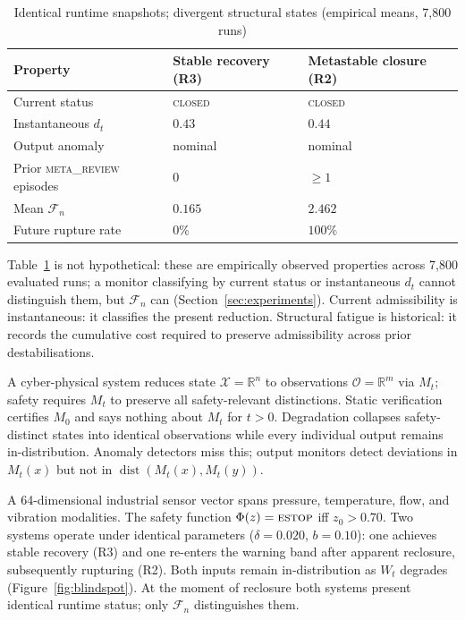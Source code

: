 \documentclass{llncs}
\DeclareMathOperator{\dist}{dist}
\newcommand{\st}[1]{\textup{\textsc{#1}}}
\begin{document}
\begin{table}[H]
\centering
\caption{Identical runtime snapshots; divergent structural states
  (empirical means, 7,800 runs)}
\label{tab:hidden}
\small
\begin{tabular}{lll}
\toprule
\textbf{Property} & \textbf{Stable recovery (R3)} & \textbf{Metastable closure (R2)} \\
\midrule
Current status                   & \st{closed} & \st{closed} \\
Instantaneous $d_t$              & $0.43$      & $0.44$ \\
Output anomaly                   & nominal     & nominal \\
Prior \st{meta\_review} episodes & $0$         & ${\geq}1$ \\
Mean $\mathcal{F}_n$             & $0.165$     & $2.462$ \\
Future rupture rate              & $0\%$       & $100\%$ \\
\bottomrule
\end{tabular}
\end{table}

Table~\ref{tab:hidden} is not hypothetical: these are empirically
observed properties across 7,800 evaluated runs; a monitor classifying
by current status or instantaneous $d_t$ cannot distinguish them, but
$\mathcal{F}_n$ can (Section~\ref{sec:experiments}).
Current admissibility is instantaneous: it classifies the present
reduction. Structural fatigue is historical: it records the cumulative
cost required to preserve admissibility across prior destabilisations.

A cyber-physical system reduces state $\mathcal{X} = \mathbb{R}^n$ to
observations $\mathcal{O} = \mathbb{R}^m$ via $M_t$; safety requires
$M_t$ to preserve all safety-relevant distinctions. Static verification
certifies $M_0$ and says nothing about $M_t$ for $t > 0$. Degradation
collapses safety-distinct states into identical observations while every
individual output remains in-distribution. Anomaly detectors miss this;
output monitors detect deviations in $M_t(x)$ but not in
$\dist(M_t(x), M_t(y))$.

\begin{example}
\label{ex:valve}
A 64-dimensional industrial sensor vector spans pressure, temperature,
flow, and vibration modalities. The safety function $\Phi(z) = \st{estop}$
iff $z_0 > 0.70$. Two systems operate under identical parameters
($\delta = 0.020$, $b = 0.10$): one achieves stable recovery (R3) and
one re-enters the warning band after apparent reclosure, subsequently
rupturing (R2). Both inputs remain in-distribution as $W_t$ degrades
(Figure~\ref{fig:blindspot}). At the moment of reclosure both systems
present identical runtime status; only $\mathcal{F}_n$ distinguishes
them.
\end{example}
\end{document}
